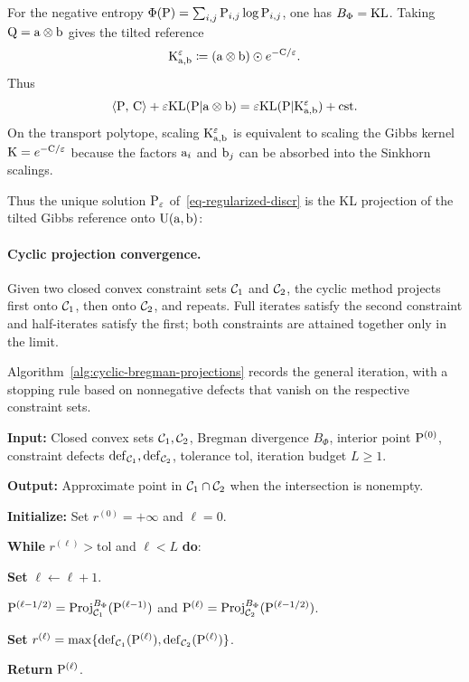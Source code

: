 For the negative entropy $\Phi(\P)=\sum_{i,j}\P_{i,j}\log\P_{i,j}$, one has $B_\Phi=\KLD$. Taking $\Q=\a\otimes\b$ gives the tilted reference
\[
	\K_{\a,\b}^\epsilon
	\eqdef
	(\a\otimes\b)\odot e^{-\C/\epsilon}.
\]
Thus
\[
	\dotp{\P}{\C}+\epsilon\KLD(\P|\a\otimes\b)
	=
	\epsilon\KLD(\P|\K_{\a,\b}^\epsilon)+\text{\upshape cst}.
\]
On the transport polytope, scaling $\K_{\a,\b}^\epsilon$ is equivalent to scaling the Gibbs kernel $\K=e^{-\C/\epsilon}$ because the factors $\a_i$ and $\b_j$ can be absorbed into the Sinkhorn scalings.

Thus the unique solution $\P_\epsilon$ of~\eqref{eq-regularized-discr} is the KL projection of the tilted Gibbs reference onto $\CouplingsD(\a,\b)$:

\paragraph{Cyclic projection convergence.}

Given two closed convex constraint sets $\Cc_1$ and $\Cc_2$, the cyclic method projects first onto $\Cc_1$, then onto $\Cc_2$, and repeats. Full iterates satisfy the second constraint and half-iterates satisfy the first; both constraints are attained together only in the limit.

Algorithm~\ref{alg:cyclic-bregman-projections} records the general iteration, with a stopping rule based on nonnegative defects that vanish on the respective constraint sets.

\begin{algH}\label{alg:cyclic-bregman-projections}
\textbf{Input:} Closed convex sets $\Cc_1,\Cc_2$, Bregman divergence $B_\Phi$, interior point $\P^{(0)}$, constraint defects $\mathrm{def}_{\Cc_1},\mathrm{def}_{\Cc_2}$, tolerance $\mathrm{tol}$, iteration budget $L\geq1$.

\textbf{Output:} Approximate point in $\Cc_1\cap\Cc_2$ when the intersection is nonempty.

\textbf{Initialize:} Set $r^{(0)}=+\infty$ and $\ell=0$.

\textbf{While} $r^{(\ell)}>\mathrm{tol}$ and $\ell<L$ \textbf{do}:
\begin{algblock}

\textbf{Set} $\ell\leftarrow \ell+1$.

$\P^{(\ell-1/2)}=\Proj_{\Cc_1}^{B_\Phi}(\P^{(\ell-1)})$ and
$\P^{(\ell)}=\Proj_{\Cc_2}^{B_\Phi}(\P^{(\ell-1/2)})$.

\textbf{Set} $r^{(\ell)}=\max\{\mathrm{def}_{\Cc_1}(\P^{(\ell)}),\mathrm{def}_{\Cc_2}(\P^{(\ell)})\}$.
\end{algblock}
\algreturnskip
\textbf{Return} $\P^{(\ell)}$.
\end{algH}

